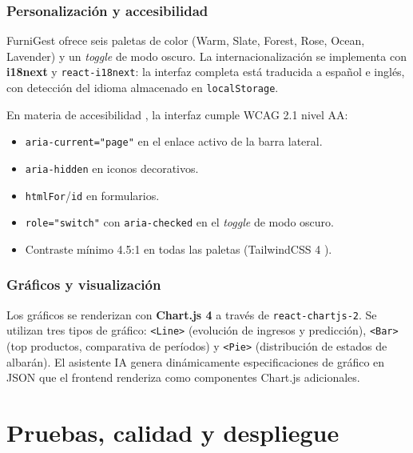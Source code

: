 \documentclass[12pt,twoside,titlepage]{report}
\begin{document}
\subsection{Personalización y accesibilidad}

FurniGest ofrece seis paletas de color (Warm, Slate, Forest, Rose, Ocean, Lavender) y un \emph{toggle} de modo oscuro. La internacionalización se implementa con \textbf{i18next} y \texttt{react-i18next}: la interfaz completa está traducida a español e inglés, con detección del idioma almacenado en \texttt{localStorage}.

En materia de accesibilidad \cite{iso9241}, la interfaz cumple WCAG 2.1 nivel AA:
\begin{itemize}[nosep]
  \item \texttt{aria-current="page"} en el enlace activo de la barra lateral.
  \item \texttt{aria-hidden} en iconos decorativos.
  \item \texttt{htmlFor}/\texttt{id} en formularios.
  \item \texttt{role="switch"} con \texttt{aria-checked} en el \emph{toggle} de modo oscuro.
  \item Contraste mínimo 4.5:1 en todas las paletas (TailwindCSS 4 \cite{tailwindcss}).
\end{itemize}

\subsection{Gráficos y visualización}

Los gráficos se renderizan con \textbf{Chart.js 4} \cite{chartjs} a través de \texttt{react-chartjs-2}. Se utilizan tres tipos de gráfico: \texttt{<Line>} (evolución de ingresos y predicción), \texttt{<Bar>} (top productos, comparativa de períodos) y \texttt{<Pie>} (distribución de estados de albarán). El asistente IA genera dinámicamente especificaciones de gráfico en JSON que el frontend renderiza como componentes Chart.js adicionales.

%
%
\chapter{Pruebas, calidad y despliegue}
\label{chap:pruebas}
\end{document}
